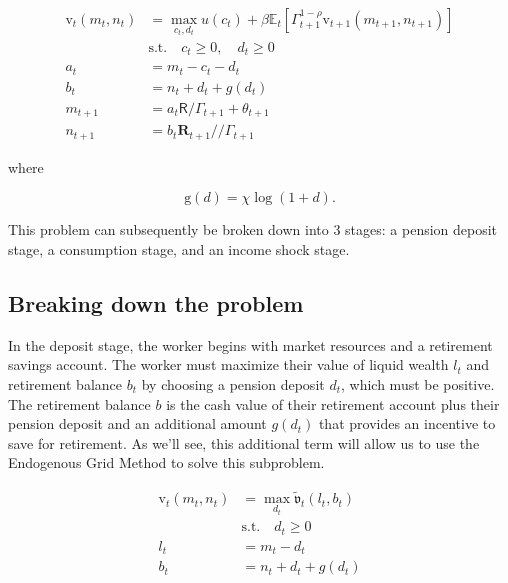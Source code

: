 \documentclass{article}
\newcommand{\DiscFac}{\beta}
\newcommand{\util}{u}
\newcommand{\tShkEmp}{\theta}
\newcommand{\Ex}{\mathbb{E}}
\newcommand{\CRRA}{\rho}
\newcommand{\bRat}{b}
\newcommand{\cRat}{c}
\newcommand{\vFunc}{\mathrm{v}}
\newcommand{\Rfree}{\mathsf{R}}
\newcommand{\PGro}{\Gamma}
\newcommand{\aRat}{a}
\newcommand{\mRat}{m}
\newcommand{\Risky}{\mathbf{R}}
\newcommand{\vOpt}{\tilde{\mathfrak{v}}}
\newcommand{\nRat}{n}
\newcommand{\dRat}{d}
\newcommand{\gFunc}{\mathrm{g}}
\newcommand{\xFer}{\chi}
\newcommand{\lRat}{l}
\begin{document}
\begin{equation}
\begin{split}
    \vFunc_{t}(\mRat_{t}, \nRat_{t}) & = \max_{\cRat_{t}, \dRat_{t}} \util(\cRat_{t}) + \DiscFac \Ex_{t} \left[ \PGro_{t+1}^{1-\CRRA} \vFunc_{t+1}(\mRat_{t+1}, \nRat_{t+1}) \right] \\
    & \text{s.t.} \quad \cRat_{t} \ge 0, \quad \dRat_{t} \ge 0 \\
    \aRat_{t} & = \mRat_{t} - \cRat_{t} - \dRat_{t} \\
    \bRat_{t} & = \nRat_{t} + \dRat_{t} + g(\dRat_{t}) \\
    \mRat_{t+1} & = \aRat_{t} \Rfree / \PGro_{t+1}  + \tShkEmp_{t+1} \\
    \nRat_{t+1} & = \bRat_{t} \Risky_{t+1} / / \PGro_{t+1}
  \end{split}
\end{equation}

where

\begin{equation}
\gFunc(\dRat) = \xFer \log(1+\dRat).
\end{equation}

This problem can subsequently be broken down into 3 stages: a pension deposit stage, a consumption stage, and an income shock stage.

\subsection{Breaking down the problem}\label{Breaking down the problem}

In the deposit stage, the worker begins with market resources and a retirement savings account. The worker must maximize their value of liquid wealth $\lRat_{t}$ and retirement balance $\bRat_{t}$ by choosing a pension deposit $\dRat_{t}$, which must be positive. The retirement balance $\bRat$ is the cash value of their retirement account plus their pension deposit and an additional amount $g(\dRat_{t})$ that provides an incentive to save for retirement. As we'll see, this additional term will allow us to use the Endogenous Grid Method to solve this subproblem.

\begin{equation}
\begin{split}
    \vFunc_{t}(\mRat_{t}, \nRat_{t}) & = \max_{\dRat_{t}} \vOpt_{t}(\lRat_{t}, \bRat_{t}) \\
    & \text{s.t.}  \quad \dRat_{t} \ge 0 \\
    \lRat_{t} & = \mRat_{t} - \dRat_{t} \\
    \bRat_{t} & = \nRat_{t} + \dRat_{t} + g(\dRat_{t})
  \end{split}
\end{equation}
\end{document}
